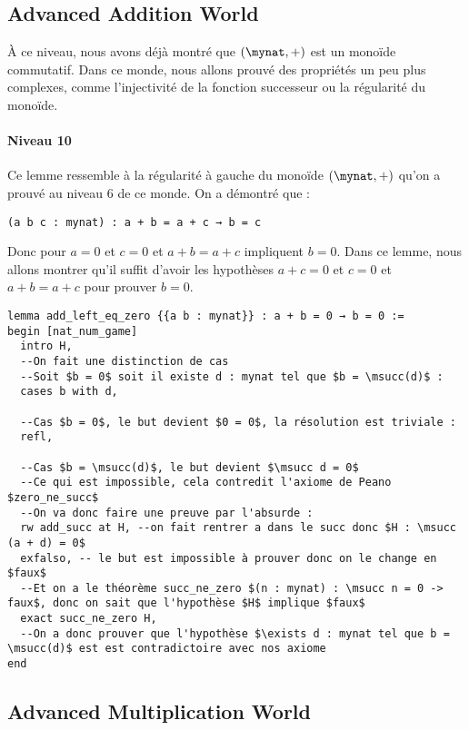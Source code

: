 \subsection{Advanced Addition World}

À ce niveau, nous avons déjà montré que $(\mynat , +)$ est un monoïde commutatif.
Dans ce monde, nous allons prouvé des propriétés un peu plus complexes, comme l'injectivité de la fonction successeur ou la régularité du monoïde.

\paragraph{Niveau 10}

Ce lemme ressemble à la régularité à gauche du monoïde $(\mynat, +)$ qu'on a prouvé au niveau 6 de ce monde.
On a démontré que :
\begin{verbatim}
(a b c : mynat) : a + b = a + c → b = c
\end{verbatim}
Donc pour $a = 0$ et $c = 0$ et $a + b = a + c$ impliquent $b = 0$.
Dans ce lemme, nous allons montrer qu'il suffit d'avoir les hypothèses $a+c = 0$ et $c = 0$ et $a + b = a + c$ pour prouver $b = 0$.

\begin{verbatim}
lemma add_left_eq_zero {{a b : mynat}} : a + b = 0 → b = 0 :=
begin [nat_num_game]
  intro H,
  --On fait une distinction de cas
  --Soit $b = 0$ soit il existe d : mynat tel que $b = \msucc(d)$ :
  cases b with d,

  --Cas $b = 0$, le but devient $0 = 0$, la résolution est triviale :
  refl,

  --Cas $b = \msucc(d)$, le but devient $\msucc d = 0$
  --Ce qui est impossible, cela contredit l'axiome de Peano $zero_ne_succ$
  --On va donc faire une preuve par l'absurde :
  rw add_succ at H, --on fait rentrer a dans le succ donc $H : \msucc (a + d) = 0$
  exfalso, -- le but est impossible à prouver donc on le change en $faux$
  --Et on a le théorème succ_ne_zero $(n : mynat) : \msucc n = 0 -> faux$, donc on sait que l'hypothèse $H$ implique $faux$
  exact succ_ne_zero H,
  --On a donc prouver que l'hypothèse $\exists d : mynat tel que b = \msucc(d)$ est est contradictoire avec nos axiome
end
\end{verbatim}

\subsection{Advanced Multiplication World}

